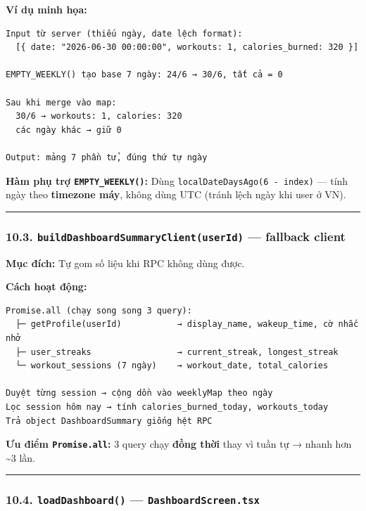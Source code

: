 \documentclass[12pt,a4paper]{article}
\begin{document}
\textbf{Ví dụ minh họa:}

\begin{verbatim}
Input từ server (thiếu ngày, date lệch format):
  [{ date: "2026-06-30 00:00:00", workouts: 1, calories_burned: 320 }]

EMPTY_WEEKLY() tạo base 7 ngày: 24/6 → 30/6, tất cả = 0

Sau khi merge vào map:
  30/6 → workouts: 1, calories: 320
  các ngày khác → giữ 0

Output: mảng 7 phần tử, đúng thứ tự ngày
\end{verbatim}

\textbf{Hàm phụ trợ \texttt{EMPTY\_WEEKLY()}:} Dùng
\texttt{localDateDaysAgo(6\ -\ index)} --- tính ngày theo
\textbf{timezone máy}, không dùng UTC (tránh lệch ngày khi user ở VN).

\begin{center}\rule{0.5\linewidth}{0.5pt}\end{center}

\subsubsection{\texorpdfstring{10.3.
\texttt{buildDashboardSummaryClient(userId)} --- fallback
client}{10.3. buildDashboardSummaryClient(userId) --- fallback client}}\label{builddashboardsummaryclientuserid-fallback-client}

\textbf{Mục đích:} Tự gom số liệu khi RPC không dùng được.

\textbf{Cách hoạt động:}

\begin{verbatim}
Promise.all (chạy song song 3 query):
  ├─ getProfile(userId)           → display_name, wakeup_time, cờ nhắc nhở
  ├─ user_streaks                 → current_streak, longest_streak
  └─ workout_sessions (7 ngày)    → workout_date, total_calories

Duyệt từng session → cộng dồn vào weeklyMap theo ngày
Lọc session hôm nay → tính calories_burned_today, workouts_today
Trả object DashboardSummary giống hệt RPC
\end{verbatim}

\textbf{Ưu điểm \texttt{Promise.all}:} 3 query chạy \textbf{đồng thời}
thay vì tuần tự → nhanh hơn \textasciitilde3 lần.

\begin{center}\rule{0.5\linewidth}{0.5pt}\end{center}

\subsubsection{\texorpdfstring{10.4. \texttt{loadDashboard()} ---
\texttt{DashboardScreen.tsx}}{10.4. loadDashboard() --- DashboardScreen.tsx}}\label{loaddashboard-dashboardscreen.tsx}
\end{document}
